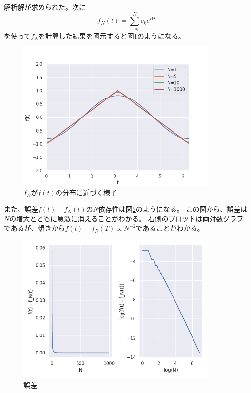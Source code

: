 \documentclass{jsarticle}
\begin{document}
解析解が求められた。次に
\begin{equation}
    f_N(t) = \sum^N_{-N} c_k e^{ikt}
\end{equation}
を使って$f_N$を計算した結果を図示すると図\ref{f1}のようになる。
\begin{figure}[htbp]
    \includegraphics[clip,width=10.0cm]{./fourier_case1.png}
    \caption{$f_N$が$f(t)$の分布に近づく様子}
    \label{f1}
\end{figure}
また、誤差$f(t) - f_N(t)$の$N$依存性は図\ref{f2}のようになる。
この図から、誤差は$N$の増大とともに急激に消えることがわかる。
右側のプロットは両対数グラフであるが、傾きから$f(t) - f_N(T) \propto N^{-2}$であることがわかる。
\begin{figure}[htbp]
    \includegraphics[clip,width=10.0cm]{./fourier_error_case1.png}
    \caption{誤差}
    \label{f2}
\end{figure}
\end{document}
